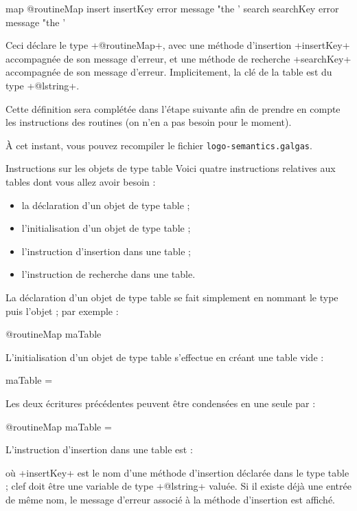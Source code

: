 \begin{galgas}
map @routineMap {
  insert insertKey error message "the '%
  search searchKey error message "the '%
}
\end{galgas}

Ceci déclare le type \ggs+@routineMap+, avec une méthode d'insertion \ggs+insertKey+ accompagnée de son message d'erreur, et une méthode de recherche \ggs+searchKey+ accompagnée de son message d'erreur. Implicitement, la clé de la table est du type \ggs+@lstring+.

Cette définition sera complétée dans l'étape suivante afin de prendre en compte les instructions des routines (on n'en a pas besoin pour le moment).

À cet instant, vous pouvez recompiler le fichier \texttt{logo-semantics.galgas}.

Instructions sur les objets de type table
Voici quatre instructions relatives aux tables dont vous allez avoir besoin :
\begin{itemize}
  \item la déclaration d'un objet de type table ;
  \item l'initialisation d'un objet de type table ;
  \item l'instruction d'insertion dans une table ;
  \item l'instruction de recherche dans une table.
\end{itemize}

La déclaration d'un objet de type table se fait simplement en nommant le type puis l'objet ; par exemple :
\begin{galgas}
@routineMap maTable
\end{galgas}

L'initialisation d'un objet de type table s'effectue en créant une table vide :
\begin{galgas}
maTable = {}
\end{galgas}

Les deux écritures précédentes peuvent être condensées en une seule par :
\begin{galgas}
@routineMap maTable = {}
\end{galgas}

L'instruction d'insertion dans une table est :
\begin{galgas}
\end{galgas}
où \ggs+insertKey+ est le nom d'une méthode d'insertion déclarée dans le type table ; clef doit être une variable de type \ggs+@lstring+ valuée. Si il existe déjà une entrée de même nom, le message d'erreur associé à la méthode d'insertion est affiché.

